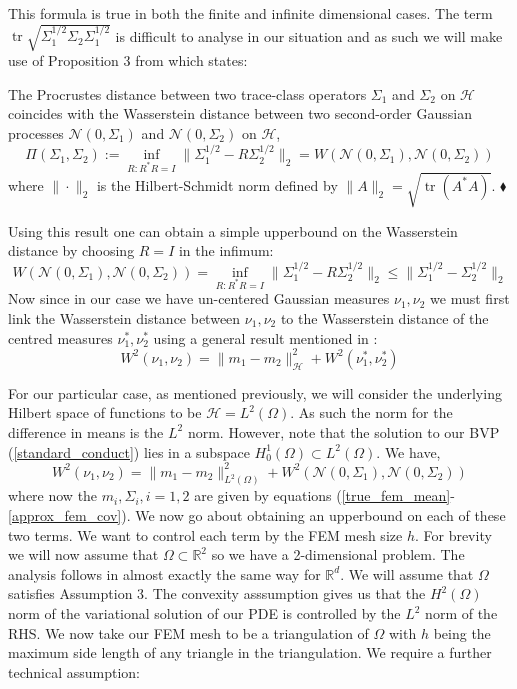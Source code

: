 This formula is true in both the finite and infinite dimensional cases. The term $\operatorname{tr}\sqrt{\Sigma_{1}^{1/2}\Sigma_{2}\Sigma_{1}^{1/2}}$ is difficult to analyse in our situation and as such we will make use of Proposition 3 from \textcolor{blue}{\cite{masarotto2019procrustes}} which states: \vspace{10pt}
\begin{proposition}
    The Procrustes distance between two trace-class operators $\Sigma_{1}$ and $\Sigma_{2}$ on $\mathcal{H}$ coincides with the Wasserstein distance between two second-order Gaussian processes $\mathcal{N}(0,\Sigma_{1})$ and $\mathcal{N}(0,\Sigma_2)$ on $\mathcal{H}$,
    $$\Pi(\Sigma_{1},\Sigma_{2}):=\inf_{R:R^{*}R=I}\|\Sigma_{1}^{1/2}-R\Sigma_{2}^{1/2}\|_{2}=W(\mathcal{N}(0,\Sigma_{1}),\mathcal{N}(0,\Sigma_{2}))$$
    where $\|\cdot\|_{2}$ is the Hilbert-Schmidt norm defined by $\|A\|_{2}=\sqrt{\operatorname{tr}(A^{*}A)}$. $\mathbin{\blacklozenge}$
\end{proposition}

Using this result one can obtain a simple upperbound on the Wasserstein distance by choosing $R=I$ in the infimum:
\begin{equation}
    W(\mathcal{N}(0,\Sigma_1),\mathcal{N}(0,\Sigma_2))=\inf_{R:R^{*}R=I}\|\Sigma_{1}^{1/2}-R\Sigma_{2}^{1/2}\|_{2} \leq \|\Sigma_{1}^{1/2}-\Sigma_{2}^{1/2}\|_{2}
\end{equation}
Now since in our case we have un-centered Gaussian measures $\nu_1,\nu_2$ we must first link the Wasserstein distance between $\nu_1,\nu_2$ to the Wasserstein distance of the centred measures $\nu_{1}^{*},\nu_{2}^{*}$ using a general result mentioned in \textcolor{blue}{\cite{cuesta1996lower}}:
\begin{equation}
    W^{2}(\nu_1,\nu_2)=\|m_1-m_2\|_{\mathcal{H}}^{2}+W^{2}(\nu_{1}^{*},\nu_{2}^{*})
\end{equation}

For our particular case, as mentioned previously, we will consider the underlying Hilbert space of functions to be $\mathcal{H}=L^2(\Omega)$. As such the norm for the difference in means is the $L^2$ norm. However, note that the solution to our BVP (\ref{standard_conduct}) lies in a subspace $H_{0}^{1}(\Omega)\subset L^{2}(\Omega)$. We have,
\begin{equation}
    W^{2}(\nu_1,\nu_2)=\|m_1-m_2\|_{L^{2}(\Omega)}^{2}+W^{2}(\mathcal{N}(0,\Sigma_1),\mathcal{N}(0,\Sigma_2))
\end{equation}
where now the $m_{i},\Sigma_{i}, i=1,2$ are given by equations (\ref{true_fem_mean}-\ref{approx_fem_cov}). We now go about obtaining an upperbound on each of these two terms. We want to control each term by the FEM mesh size $h$. For brevity we will now assume that $\Omega\subset\mathbb{R}^2$ so we have a 2-dimensional problem. The analysis follows in almost exactly the same way for $\mathbb{R}^{d}$. We will assume that $\Omega$ satisfies Assumption 3. The convexity asssumption gives us that the $H^{2}(\Omega)$ norm of the variational solution of our PDE is controlled by the $L^2$ norm of the RHS. We now take our FEM mesh to be a triangulation of $\Omega$ with $h$ being the maximum side length of any triangle in the triangulation. We require a further technical assumption:

